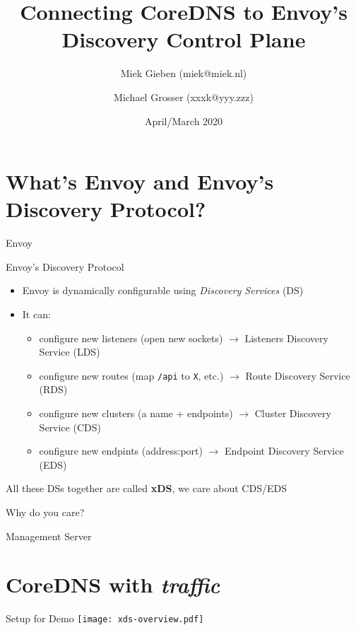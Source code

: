 \documentclass[aspectratio=169]{beamer}
\title{Connecting CoreDNS to Envoy's Discovery Control Plane}
\date{April/March 2020}
\author{Miek Gieben (miek@miek.nl) \and Michael Grosser (xxxk@yyy.zzz)}
\institute{Centre for protobuf Nerding}
\begin{document}
    \let\oldfootnotesize\footnotesize
    \renewcommand*{\footnotesize}{\oldfootnotesize\tiny}

    \maketitle

    \section{What's Envoy and Envoy's Discovery Protocol?}
    \begin{frame}{Envoy}

    \end{frame}

    \begin{frame}{Envoy's Discovery Protocol}
        \begin{itemize}
            \item Envoy is dynamically configurable using \emph{Discovery Services} (DS)
            \item It can:
            \begin{itemize}
                \item configure new listeners (open new sockets) $\rightarrow$ Listeners Discovery Service (LDS)
                \item configure new routes (map \texttt{/api} to \texttt{X}, etc.) $\rightarrow$ Route Discovery Service (RDS)
                \item configure new clusters (a name + endpoints) $\rightarrow$ Cluster Discovery Service (CDS)
                \item configure new endpints (address:port) $\rightarrow$ Endpoint Discovery Service (EDS)
            \end{itemize}
        \end{itemize}

        All these DSs together are called {\bf xDS}, we care about CDS/EDS
    \end{frame}

    \begin{frame}{Why do you care?}

    \end{frame}

    \begin{frame}{Management Server}

    \end{frame}

    \section{CoreDNS with \emph{traffic}}

    \begin{frame}{Setup for Demo}
        \texttt{[image: xds-overview.pdf]}
    \end{frame}
\end{document}
